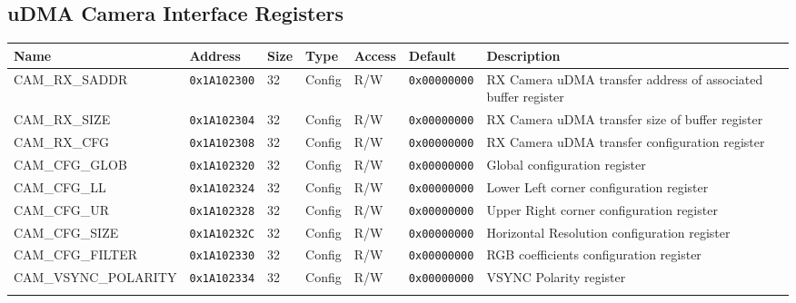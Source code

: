 
\subsection{uDMA Camera Interface Registers}
{\small
\begin{tabularx}{\textwidth}{|l|l|l|l|l|l|X|}
  \hline
  \textbf{Name} & \textbf{Address}  & \textbf{Size} & \textbf{Type} & \textbf{Access} & \textbf{Default} & \textbf{Description} \\
  \hline
  CAM\_RX\_SADDR & \texttt{0x1A102300} & 32 & Config & R/W & \texttt{0x00000000} & RX Camera uDMA transfer address of associated buffer register\\
  \hline
  CAM\_RX\_SIZE & \texttt{0x1A102304} & 32 & Config & R/W & \texttt{0x00000000} & RX Camera uDMA transfer size of buffer register\\
  \hline
  CAM\_RX\_CFG & \texttt{0x1A102308} & 32 & Config & R/W & \texttt{0x00000000} & RX Camera uDMA transfer configuration register\\
  \hline
  CAM\_CFG\_GLOB & \texttt{0x1A102320} & 32 & Config & R/W & \texttt{0x00000000} & Global configuration register\\
  \hline
  CAM\_CFG\_LL & \texttt{0x1A102324} & 32 & Config & R/W & \texttt{0x00000000} & Lower Left corner configuration register\\
  \hline
  CAM\_CFG\_UR & \texttt{0x1A102328} & 32 & Config & R/W & \texttt{0x00000000} & Upper Right corner configuration register\\
  \hline
  CAM\_CFG\_SIZE & \texttt{0x1A10232C} & 32 & Config & R/W & \texttt{0x00000000} & Horizontal Resolution configuration register\\
  \hline
  CAM\_CFG\_FILTER & \texttt{0x1A102330} & 32 & Config & R/W & \texttt{0x00000000} & RGB coefficients configuration register\\
  \hline
  CAM\_VSYNC\_POLARITY & \texttt{0x1A102334} & 32 & Config & R/W & \texttt{0x00000000} & VSYNC Polarity register\\
  \hline
  \caption{uDMA Camera Interface}
\end{tabularx}
}




